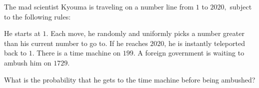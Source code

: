 \documentclass[mast]{lucky}
\begin{document}
\begin{req}[NARML 2020/8]{13}
The mad scientist Kyouma is traveling on a number line from $1$ to $2020,$ subject to the following rules:
\begin{itemize}
\Item He starts at $1.$
\Item Each move, he randomly and uniformly picks a number greater than his current number to go to.
\Item If he reaches $2020$, he is instantly teleported back to $1.$
\Item There is a time machine on $199.$
\Item A foreign government is waiting to ambush him on $1729.$
\end{itemize}
What is the probability that he gets to the time machine before being ambushed?
\end{req}
\end{document}
